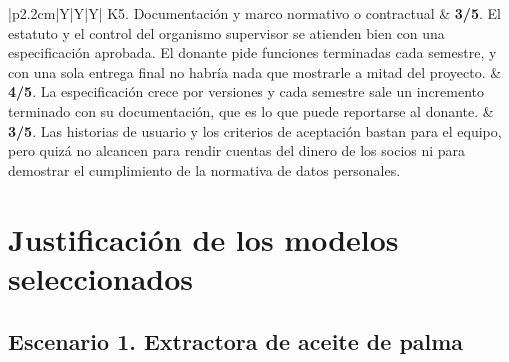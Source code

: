 \documentclass[11pt,a4paper]{article}
\begin{document}
\begin{tabularx}{\textwidth}{|p{2.2cm}|Y|Y|Y|}
		K5. Documentación y marco normativo o contractual &
		\textbf{3/5}. El estatuto y el control del organismo supervisor se atienden bien con una especificación aprobada. El donante pide funciones terminadas cada semestre, y con una sola entrega final no habría nada que mostrarle a mitad del proyecto. &
		\textbf{4/5}. La especificación crece por versiones y cada semestre sale un incremento terminado con su documentación, que es lo que puede reportarse al donante. &
		\textbf{3/5}. Las historias de usuario y los criterios de aceptación bastan para el equipo, pero quizá no alcancen para rendir cuentas del dinero de los socios ni para demostrar el cumplimiento de la normativa de datos personales. \\ \hline
	\end{tabularx}
	\normalsize
	
	
	\section{Justificación de los modelos seleccionados}
	
	\subsection{Escenario 1. Extractora de aceite de palma}
	
\end{document}
